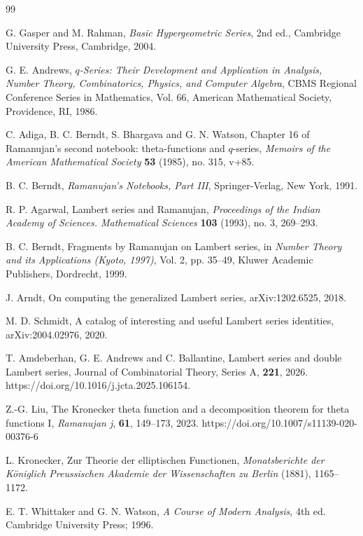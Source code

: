 \documentclass[12pt]{article}
\begin{document}
\begin{thebibliography}{99}

G. Gasper and M. Rahman,
\emph{Basic Hypergeometric Series},
2nd ed., Cambridge University Press, Cambridge, 2004.

G. E. Andrews,
\emph{\(q\)-Series: Their Development and Application in Analysis,
Number Theory, Combinatorics, Physics, and Computer Algebra},
CBMS Regional Conference Series in Mathematics, Vol. 66,
American Mathematical Society, Providence, RI, 1986.

C. Adiga, B. C. Berndt, S. Bhargava and G. N. Watson,
Chapter 16 of Ramanujan's second notebook: theta-functions and \(q\)-series,
\emph{Memoirs of the American Mathematical Society} \textbf{53}
(1985), no. 315, v+85.

B. C. Berndt,
\emph{Ramanujan's Notebooks, Part III},
Springer-Verlag, New York, 1991.

R. P. Agarwal,
Lambert series and Ramanujan,
\emph{Proceedings of the Indian Academy of Sciences. Mathematical Sciences}
\textbf{103} (1993), no. 3, 269--293.

B. C. Berndt,
Fragments by Ramanujan on Lambert series,
in \emph{Number Theory and its Applications (Kyoto, 1997)},
Vol. 2, pp. 35--49, Kluwer Academic Publishers, Dordrecht, 1999.

J. Arndt,
On computing the generalized Lambert series,
arXiv:1202.6525, 2018.

M. D. Schmidt,
A catalog of interesting and useful Lambert series identities,
arXiv:2004.02976, 2020.

T. Amdeberhan, G. E. Andrews and C. Ballantine,
Lambert series and double Lambert series, 
Journal of Combinatorial Theory, Series A, \textbf{221}, 2026. 
https://doi.org/10.1016/j.jcta.2025.106154.


Z.-G. Liu,
The Kronecker theta function and a decomposition theorem for theta functions I,
\emph{Ramanujan j}, \textbf{61}, 149--173, 2023.
https://doi.org/10.1007/s11139-020-00376-6

L. Kronecker,
Zur Theorie der elliptischen Functionen,
\emph{Monatsberichte der K{\"o}niglich Preussischen Akademie der Wissenschaften
zu Berlin} (1881), 1165--1172.

E. T. Whittaker and G. N. Watson,
\emph{A Course of Modern Analysis},
4th ed. Cambridge University Press; 1996.


\end{thebibliography}
\end{document}
